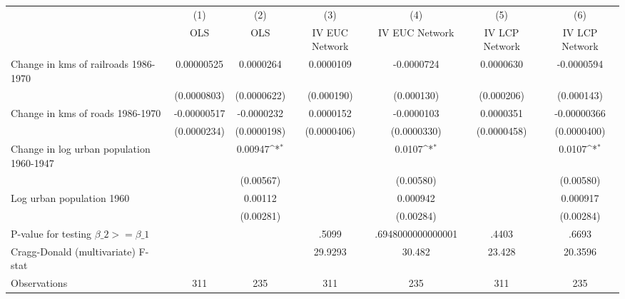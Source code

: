 {
\def\sym#1{\ifmmode^{#1}\else\(^{#1}\)\fi}
\begin{tabular}{l*{6}{c}}
\hline\hline
                &\multicolumn{1}{c}{(1)}&\multicolumn{1}{c}{(2)}&\multicolumn{1}{c}{(3)}&\multicolumn{1}{c}{(4)}&\multicolumn{1}{c}{(5)}&\multicolumn{1}{c}{(6)}\\
                &\multicolumn{1}{c}{OLS}&\multicolumn{1}{c}{OLS}&\multicolumn{1}{c}{IV EUC Network}&\multicolumn{1}{c}{IV EUC Network}&\multicolumn{1}{c}{IV LCP Network}&\multicolumn{1}{c}{IV LCP Network}\\
\hline
Change in kms of railroads 1986-1970&0.00000525         &0.0000264         &0.0000109         &-0.0000724         &0.0000630         &-0.0000594         \\
                &(0.0000803)         &(0.0000622)         &(0.000190)         &(0.000130)         &(0.000206)         &(0.000143)         \\
[1em]
Change in kms of roads 1986-1970&-0.00000517         &-0.0000232         &0.0000152         &-0.0000103         &0.0000351         &-0.00000366         \\
                &(0.0000234)         &(0.0000198)         &(0.0000406)         &(0.0000330)         &(0.0000458)         &(0.0000400)         \\
[1em]
Change in log urban population 1960-1947&                  &  0.00947\sym{*}  &                  &   0.0107\sym{*}  &                  &   0.0107\sym{*}  \\
                &                  &(0.00567)         &                  &(0.00580)         &                  &(0.00580)         \\
[1em]
Log urban population 1960&                  &  0.00112         &                  & 0.000942         &                  & 0.000917         \\
                &                  &(0.00281)         &                  &(0.00284)         &                  &(0.00284)         \\
\hline
P-value for testing $\beta\_{2} >= \beta\_{1}$&                  &                  &    .5099         &.6948000000000001         &    .4403         &    .6693         \\
Cragg-Donald (multivariate) F-stat&                  &                  &  29.9293         &   30.482         &   23.428         &  20.3596         \\
Observations    &      311         &      235         &      311         &      235         &      311         &      235         \\
\hline\hline
\end{tabular}
}
